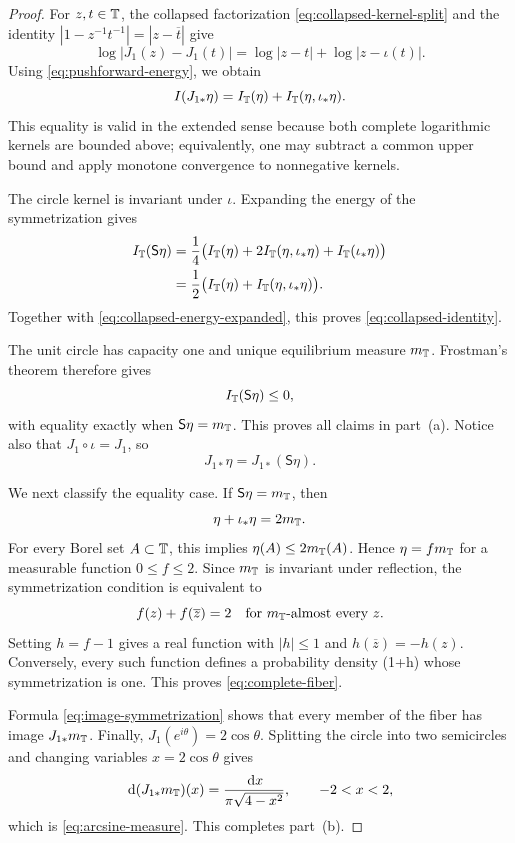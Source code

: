 \begin{proof}
For \(z,t\in\mathbb{T}\), the collapsed factorization
\eqref{eq:collapsed-kernel-split} and the identity
\(|1-z^{-1}t^{-1}|=|z-\overline t|\) give
\[
 \log|J_1(z)-J_1(t)|
 =\log|z-t|+\log|z-\iota(t)|.
\]
Using \eqref{eq:pushforward-energy}, we obtain
\begin{equation}\label{eq:collapsed-energy-expanded}
 I(J_{1\ast}\eta)
 =I_{\mathbb{T}}(\eta)+I_{\mathbb{T}}(\eta,\iota_\ast\eta).
\end{equation}
This equality is valid in the extended sense because both complete
logarithmic kernels are bounded above; equivalently, one may subtract a
common upper bound and apply monotone convergence to nonnegative
kernels.

The circle kernel is invariant under \(\iota\).  Expanding the energy of
the symmetrization gives
\begin{align*}
 I_{\mathbb{T}}(\mathsf S\eta)
 &=\frac14\bigl(
 I_{\mathbb{T}}(\eta)
 +2I_{\mathbb{T}}(\eta,\iota_\ast\eta)
 +I_{\mathbb{T}}(\iota_\ast\eta)\bigr)\\
 &=\frac12\bigl(
 I_{\mathbb{T}}(\eta)+I_{\mathbb{T}}(\eta,\iota_\ast\eta)
 \bigr).
\end{align*}
Together with \eqref{eq:collapsed-energy-expanded}, this proves
\eqref{eq:collapsed-identity}.

The unit circle has capacity one and unique equilibrium measure
\(m_{\mathbb{T}}\).  Frostman's theorem therefore gives
\[
 I_{\mathbb{T}}(\mathsf S\eta)\leq0,
\]
with equality exactly when \(\mathsf S\eta=m_{\mathbb{T}}\).  This proves all
claims in part~\textup{(a)}.  Notice also that
\(J_1\circ\iota=J_1\), so
\begin{equation}\label{eq:image-symmetrization}
 J_{1\ast}\eta=J_{1\ast}(\mathsf S\eta).
\end{equation}

We next classify the equality case.  If
\(\mathsf S\eta=m_{\mathbb{T}}\), then
\[
 \eta+\iota_\ast\eta=2m_{\mathbb{T}}.
\]
For every Borel set \(A\subset\mathbb{T}\), this implies
\(\eta(A)\leq2m_{\mathbb{T}}(A)\).  Hence
\(\eta=fm_{\mathbb{T}}\) for a measurable function \(0\leq f\leq2\).  Since
\(m_{\mathbb{T}}\) is invariant under reflection, the symmetrization condition
is equivalent to
\[
 f(z)+f(\overline z)=2
 \quad\text{for }m_{\mathbb{T}}\text{-almost every }z.
\]
Setting \(h=f-1\) gives a real function with
\(|h|\leq1\) and \(h(\overline z)=-h(z)\).  Conversely, every such
function defines a probability density (1+h) whose symmetrization is
one.  This proves \eqref{eq:complete-fiber}.

Formula \eqref{eq:image-symmetrization} shows that every member of the
fiber has image \(J_{1\ast}m_{\mathbb{T}}\).  Finally,
\(J_1(e^{i\theta})=2\cos\theta\).  Splitting the circle into two
semicircles and changing variables \(x=2\cos\theta\) gives
\[
 \,\mathrm{d}(J_{1\ast}m_{\mathbb{T}})(x)
 =\frac{\,\mathrm{d} x}{\pi\sqrt{4-x^2}},
 \qquad -2<x<2,
\]
which is \eqref{eq:arcsine-measure}.  This completes part~\textup{(b)}.


\end{proof}
